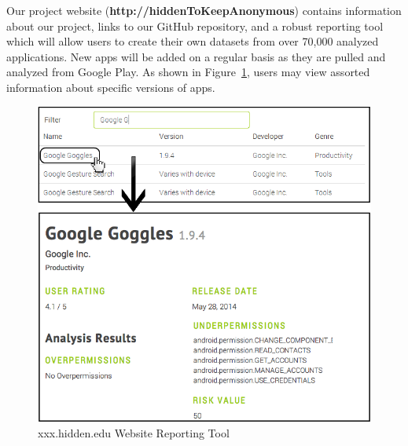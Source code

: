 \documentclass{sig-alternate}
\newif\ifisnopii
\begin{document}

Our project website (\textbf{\ifisnopii http://darwin.rit.edu \else http://hiddenToKeepAnonymous\fi}) contains information about our project, links to our GitHub repository, and a robust reporting tool which will allow users to create their own datasets from over 70,000 analyzed applications. New apps will be added on a regular basis as they are pulled and analyzed from Google Play. As shown in Figure~\ref{fig:website1}, users may view assorted information about specific versions of apps.


 \begin{figure}[ht!]
\centering
\includegraphics[width=\columnwidth, angle = 0]{images/screenshot3.png}
\caption{\ifisnopii darwin.rit.edu \else xxx.hidden.edu \fi Website Reporting Tool}
\label{fig:website1}
\end{figure}
\end{document}
